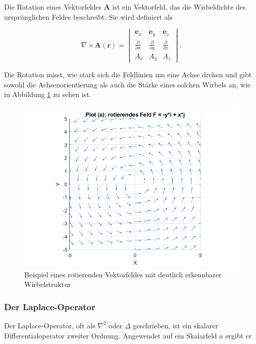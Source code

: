 Die Rotation eines Vektorfeldes $\mathbf{A}$ ist ein Vektorfeld, das die Wirbeldichte des ursprünglichen Feldes beschreibt. Sie wird definiert als

\begin{equation}
\nabla \times \mathbf{A}(\mathbf{r}) = \begin{vmatrix}
    \mathbf{e}_x & \mathbf{e}_y & \mathbf{e}_z \\
    \frac{\partial}{\partial x} & \frac{\partial}{\partial y} & \frac{\partial}{\partial z}\\
    A_x & A_y & A_z
\end{vmatrix}.
\end{equation}

\noindent Die Rotation misst, wie stark sich die Feldlinien um eine Achse drehen und gibt sowohl die Achsenorientierung als auch die Stärke eines solchen Wirbels an, wie in Abbildung \ref{fig:RotationAlg} zu sehen ist.

\begin{figure}[h!]
    \centering
    \includegraphics[scale=0.4]{papers/helmholtz/images/rotierendes_Feld.png}
    \caption{Beispiel eines rotierenden Vektorfeldes mit deutlich erkennbarer Wirbelstruktur}
    \label{fig:RotationAlg}
\end{figure}

\subsubsection{Der Laplace-Operator}

Der Laplace-Operator, oft als $\nabla^2$ oder $\Delta$ geschrieben, ist ein skalarer Differentialoperator zweiter Ordnung. Angewendet auf ein Skalarfeld $a$ ergibt er

